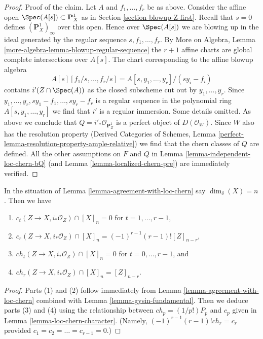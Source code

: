 \begin{proof}
\medskip\noindent
Proof of the claim. Let $A$ and $f_1, \ldots, f_r$ be as above.
Consider the affine open $\Spec(A[s]) \subset \mathbf{P}^1_X$
as in Section \ref{section-blowup-Z-first}. Recall that $s = 0$
defines $(\mathbf{P}^1_X)_\infty$ over this open. Hence over
$\Spec(A[s])$ we are blowing up in the ideal generated by
the regular sequence $s, f_1, \ldots, f_r$. By More on Algebra, Lemma
\ref{more-algebra-lemma-blowup-regular-sequence} the $r + 1$
affine charts are global complete intersections over $A[s]$.
The chart corresponding to the affine blowup algebra
$$
A[s][f_1/s, \ldots, f_r/s] = A[s, y_1, \ldots, y_r]/(sy_i - f_i)
$$
contains $i'(Z \cap \Spec(A))$ as the closed subscheme cut out by
$y_1, \ldots, y_r$. Since $y_1, \ldots, y_r, sy_1 - f_1, \ldots, sy_r - f_r$
is a regular sequence in the polynomial ring $A[s, y_1, \ldots, y_r]$
we find that $i'$ is a regular immersion. Some details omitted.
As above we conclude that $Q = i'_*\mathcal{O}_{\mathbf{P}^1_Z}$
is a perfect object of $D(\mathcal{O}_W)$. Since $W$ also has
the resolution property (Derived Categories of Schemes,
Lemma \ref{perfect-lemma-resolution-property-ample-relative})
we find that the chern classes of $Q$ are defined. All the
other assumptions on $F$ and $Q$ in Lemma \ref{lemma-independent-loc-chern-bQ}
(and Lemma \ref{lemma-localized-chern-pre}) are immediately verified.
\end{proof}

\begin{lemma}
\label{lemma-actual-computation}
In the situation of Lemma \ref{lemma-agreement-with-loc-chern}
say $\dim_\delta(X) = n$. Then we have
\begin{enumerate}
\item $c_t(Z \to X, i_*\mathcal{O}_Z) \cap [X]_n = 0$ for
$t = 1, \ldots, r - 1$,
\item $c_r(Z \to X, i_*\mathcal{O}_Z) \cap [X]_n =
(-1)^{r - 1}(r - 1)![Z]_{n - r}$,
\item $ch_t(Z \to X, i_*\mathcal{O}_Z) \cap [X]_n = 0$ for
$t = 0, \ldots, r - 1$, and
\item $ch_r(Z \to X, i_*\mathcal{O}_Z) \cap [X]_n = [Z]_{n - r}$.
\end{enumerate}
\end{lemma}

\begin{proof}
Parts (1) and (2) follow immediately from
Lemma \ref{lemma-agreement-with-loc-chern}
combined with Lemma \ref{lemma-gysin-fundamental}.
Then we deduce parts (3) and (4) using the relationship
between $ch_p = (1/p!)P_p$ and $c_p$ given in
Lemma \ref{lemma-loc-chern-character}. (Namely,
$(-1)^{r - 1}(r - 1)!ch_r = c_r$ provided
$c_1 = c_2 = \ldots = c_{r - 1} = 0$.)
\end{proof}







